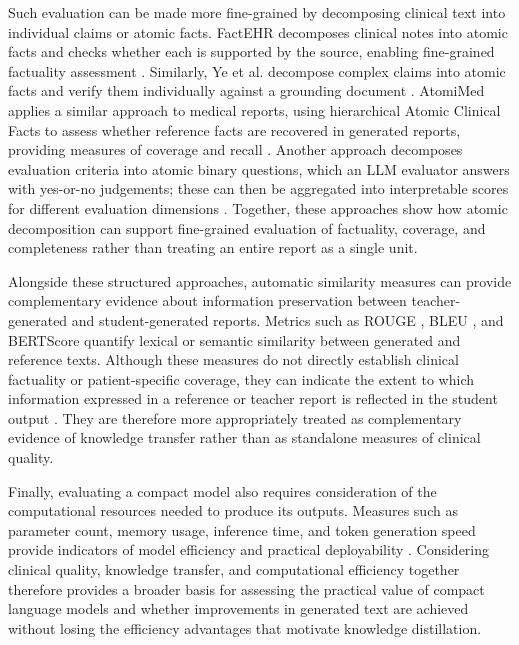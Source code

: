 \documentclass[ %
                    author={Aman Kumar Singh},
                supervisor={Dr. Edwin Simpson},
                    degree={MSc},
                     title={Quality-Aware Knowledge Distillation of Large Language Models for Efficient Personalised Clinical Report Generation},
                  subtitle={},
                      type={},
                      year={2021}]{dissertation}
\begin{document}
Such evaluation can be made more fine-grained by decomposing clinical text into individual claims or atomic facts. FactEHR decomposes clinical notes into atomic facts and checks whether each is supported by the source, enabling fine-grained factuality assessment \cite{munnangi_factehr_2025}. Similarly, Ye et al. decompose complex claims into atomic facts and verify them individually against a grounding document \cite{ye_teaching_2026}. AtomiMed applies a similar approach to medical reports, using hierarchical Atomic Clinical Facts to assess whether reference facts are recovered in generated reports, providing measures of coverage and recall \cite{wang_atomimed_2026}. Another approach decomposes evaluation criteria into atomic binary questions, which an LLM evaluator answers with yes-or-no judgements; these can then be aggregated into interpretable scores for different evaluation dimensions \cite{cho_ask_2026}. Together, these approaches show how atomic decomposition can support fine-grained evaluation of factuality, coverage, and completeness rather than treating an entire report as a single unit.

Alongside these structured approaches, automatic similarity measures can
provide complementary evidence about information preservation between
teacher-generated and student-generated reports. Metrics such as ROUGE
\cite{lin_rouge_2004}, BLEU \cite{ward_bleu_2001}, and BERTScore
\cite{zhang_bertscore_2020} quantify lexical or semantic similarity between
generated and reference texts. Although these measures do not directly
establish clinical factuality or patient-specific coverage, they can indicate
the extent to which information expressed in a reference or teacher report
is reflected in the student output \cite{dahlberg_measuring_2026}. They are therefore more appropriately
treated as complementary evidence of knowledge transfer rather than as
standalone measures of clinical quality.

Finally, evaluating a compact model also requires consideration of the
computational resources needed to produce its outputs. Measures such as
parameter count, memory usage, inference time, and token generation speed
provide indicators of model efficiency and practical deployability
\cite{garg_rise_2025}. Considering clinical quality, knowledge transfer, and
computational efficiency together therefore provides a broader basis for
assessing the practical value of compact language models and whether
improvements in generated text are achieved without losing the efficiency
advantages that motivate knowledge distillation.
\end{document}
